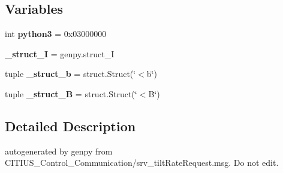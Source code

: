 \subsection*{\-Variables}
\begin{DoxyCompactItemize}
\item 
\hypertarget{namespace_c_i_t_i_u_s___control___communication_1_1srv_1_1__srv__tilt_rate_ac949e9f8cdb95103ade2bd3e402e72ab}{int {\bfseries python3} = 0x03000000}\label{namespace_c_i_t_i_u_s___control___communication_1_1srv_1_1__srv__tilt_rate_ac949e9f8cdb95103ade2bd3e402e72ab}

\item 
\hypertarget{namespace_c_i_t_i_u_s___control___communication_1_1srv_1_1__srv__tilt_rate_a3a044a93a1311e6c81611c3fc4e0f254}{{\bfseries \-\_\-struct\-\_\-\-I} = genpy.\-struct\-\_\-\-I}\label{namespace_c_i_t_i_u_s___control___communication_1_1srv_1_1__srv__tilt_rate_a3a044a93a1311e6c81611c3fc4e0f254}

\item 
\hypertarget{namespace_c_i_t_i_u_s___control___communication_1_1srv_1_1__srv__tilt_rate_ab5699b645e811d57ed2c054deb3ae8f7}{tuple {\bfseries \-\_\-struct\-\_\-b} = struct.\-Struct(\char`\"{}$<$b\char`\"{})}\label{namespace_c_i_t_i_u_s___control___communication_1_1srv_1_1__srv__tilt_rate_ab5699b645e811d57ed2c054deb3ae8f7}

\item 
\hypertarget{namespace_c_i_t_i_u_s___control___communication_1_1srv_1_1__srv__tilt_rate_ae0b08b547dc02a6b46bae907336b9cbf}{tuple {\bfseries \-\_\-struct\-\_\-\-B} = struct.\-Struct(\char`\"{}$<$\-B\char`\"{})}\label{namespace_c_i_t_i_u_s___control___communication_1_1srv_1_1__srv__tilt_rate_ae0b08b547dc02a6b46bae907336b9cbf}

\end{DoxyCompactItemize}


\subsection{\-Detailed \-Description}
\begin{DoxyVerb}autogenerated by genpy from CITIUS_Control_Communication/srv_tiltRateRequest.msg. Do not edit.\end{DoxyVerb}
 